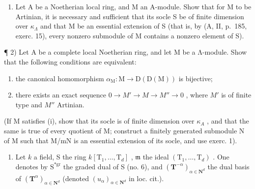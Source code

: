 
\begin{enumerate}
\def\labelenumi{\arabic{enumi})}
\tightlist
\item
  Let A be a Noetherian local ring, and M an A-module. Show that for M to be Artinian, it is necessary and sufficient that its socle S be of finite dimension over \(\kappa_{\Lambda}\) and that M be an essential extension of S (that is, by (A, II, p.~185, exerc. 15), every nonzero submodule of M contains a nonzero element of S).
\end{enumerate}

¶ 2) Let A be a complete local Noetherian ring, and let M be a Λ-module. Show that the following conditions are equivalent:

\begin{enumerate}
\def\labelenumi{(\roman{enumi})}
\item
  the canonical homomorphism \(\alpha_{\mathrm{M}}: \mathrm{M} \to \mathrm{D}(\mathrm{D}(\mathrm{M}))\) is bijective;
\item
  there exists an exact sequence \(0 \to M' \to M \to M'' \to 0\) , where \(M'\) is of finite type and \(M''\) Artinian.
\end{enumerate}

(If M satisfies (i), show that its socle is of finite dimension over \(\kappa_{A}\) , and that the same is true of every quotient of M; construct a finitely generated submodule N of M such that M/mN is an essential extension of its socle, and use exerc. 1).

\begin{enumerate}
\def\labelenumi{\arabic{enumi})}
\setcounter{enumi}{2}
\tightlist
\item
  Let \(k\) a field, S the ring \(k[\mathrm{T}_{1},\ldots ,\mathrm{T}_{d}]\) , \(\mathfrak{m}\) the ideal \((\mathrm{T}_1,\dots ,\mathrm{T}_d)\) . One denotes by \(\mathrm{S^{*gr}}\) the graded dual of S (no. 6), and \((\mathbf{T}^{-\alpha})_{\alpha \in \mathbf{N}^d}\) the dual basis of \((\mathbf{T}^{\alpha})_{\alpha \in \mathbf{N}^d}\) (denoted \((u_{\alpha})_{\alpha \in \mathbf{N}^d}\) in loc. cit.).
\end{enumerate}

